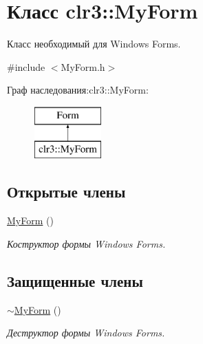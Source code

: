 \hypertarget{classclr3_1_1_my_form}{}\section{Класс clr3\+::My\+Form}
\label{classclr3_1_1_my_form}


Класс необходимый для Windows Forms.  




{\ttfamily \#include $<$My\+Form.\+h$>$}

Граф наследования\+:clr3\+::My\+Form\+:\begin{figure}[H]
\begin{center}
\leavevmode
\includegraphics[height=2.000000cm]{classclr3_1_1_my_form}
\end{center}
\end{figure}
\subsection*{Открытые члены}
\begin{DoxyCompactItemize}
\item 
\mbox{\label{classclr3_1_1_my_form_aeb7fa99f729aa62cccfce49a67c48136}} 
\mbox{\hyperlink{classclr3_1_1_my_form_aeb7fa99f729aa62cccfce49a67c48136}{My\+Form}} ()
\begin{DoxyCompactList}\small\item\em Коструктор формы Windows Forms. \end{DoxyCompactList}\end{DoxyCompactItemize}
\subsection*{Защищенные члены}
\begin{DoxyCompactItemize}
\item 
\mbox{\label{classclr3_1_1_my_form_a463de4e1b957915b35cbdd3438593673}} 
\mbox{\hyperlink{classclr3_1_1_my_form_a463de4e1b957915b35cbdd3438593673}{$\sim$\+My\+Form}} ()
\begin{DoxyCompactList}\small\item\em Деструктор формы Windows Forms. \end{DoxyCompactList}\end{DoxyCompactItemize}


